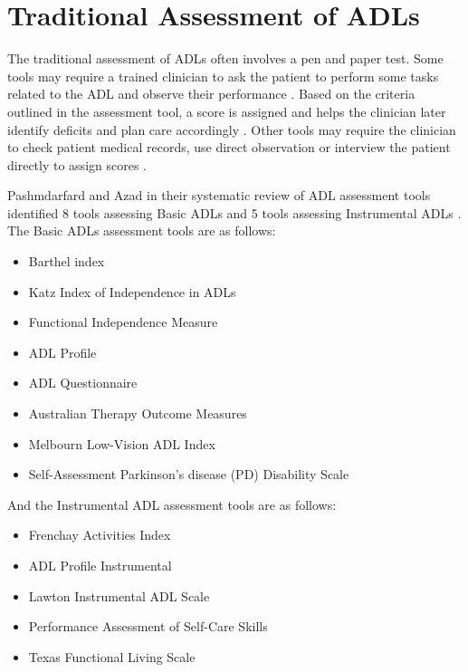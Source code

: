 \section{Traditional Assessment of ADLs}\label{sec:Trad ADL Assessment}
The traditional assessment of ADLs often involves a pen and paper test. Some tools may require a trained clinician to ask the patient to perform some tasks related to the ADL and observe their performance \cite{pashmdarfard_assessment_2020}. Based on the criteria outlined in the assessment tool, a score is assigned and helps the clinician later identify deficits and plan care accordingly \cite{mcmahon_katz_nodate}. Other tools may require the clinician to check patient medical records, use direct observation or interview the patient directly to assign scores \cite{katz_for_the_association_of_rheumatology_health_professionals_outcomes_measures_task_force_measures_2003}. 

Pashmdarfard and Azad in their systematic review of ADL assessment tools identified 8 tools assessing Basic ADLs and 5 tools assessing Instrumental ADLs \cite{pashmdarfard_assessment_2020}. The Basic ADLs assessment tools are as follows:

\begin{itemize}
    \item Barthel index
    \item Katz Index of Independence in ADLs
    \item Functional Independence Measure
    \item ADL Profile
    \item ADL Questionnaire
    \item Australian Therapy Outcome Measures
    \item Melbourn Low-Vision ADL Index
    \item Self-Assessment Parkinson's disease (PD) Disability Scale 
\end{itemize}

And the Instrumental ADL assessment tools are as follows:

\begin{itemize}
    \item Frenchay Activities Index
    \item ADL Profile Instrumental
    \item Lawton Instrumental ADL Scale
    \item Performance Assessment of Self-Care Skills
    \item Texas Functional Living Scale
\end{itemize}


